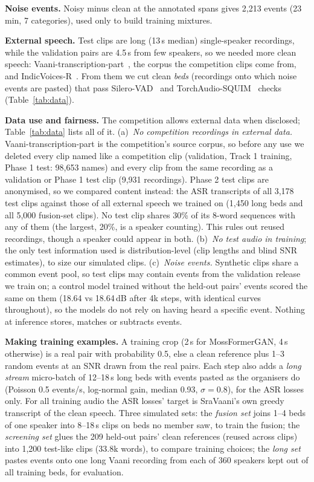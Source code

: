 \documentclass[conference]{IEEEtran}
\begin{document}
\textbf{Noise events.} Noisy minus clean at the annotated spans gives 2,213 events (23\,min, 7 categories), used
only to build training mixtures.

\textbf{External speech.} Test clips are long (13\,s median) single-speaker recordings, while the validation pairs
are 4.5\,s from few speakers, so we needed more clean speech: Vaani-transcription-part~\cite{vaani}, the corpus the
competition clips come from, and IndicVoices-R~\cite{ivr}. From them we cut clean \emph{beds} (recordings onto which
noise events are pasted) that pass Silero-VAD~\cite{silero} and TorchAudio-SQUIM~\cite{squim} checks
(Table~\ref{tab:data}).

\textbf{Data use and fairness.} The competition allows external data when disclosed; Table~\ref{tab:data} lists all
of it. (a)~\emph{No competition recordings in external data.} Vaani-transcription-part is the competition's source
corpus, so before any use we deleted every clip named like a competition clip (validation, Track 1 training, Phase 1
test: 98,653 names) and every clip from the same recording as a validation or Phase 1 test clip (9,931 recordings). Phase 2 test clips are anonymised, so we compared content instead: the ASR
transcripts of all 3,178 test clips against those of all external speech we trained on (1,450 long beds and all 5,000
fusion-set clips). No test clip shares 30\% of its 8-word sequences with any of them (the largest, 20\%, is a speaker
counting). This rules out reused recordings, though a speaker could appear in both.
(b)~\emph{No test audio in training}; the only test information used is distribution-level (clip lengths and blind SNR
estimates), to size our simulated clips. (c)~\emph{Noise events.} Synthetic clips share a common event pool, so test
clips may contain events from the validation release we train on; a control model trained without the held-out pairs'
events scored the same on them (18.64 vs 18.64\,dB after 4k steps, with identical curves throughout), so the models do not rely on having heard a specific event.
Nothing at inference stores, matches or subtracts events.

\textbf{Making training examples.} A training crop (2\,s for MossFormerGAN, 4\,s otherwise) is a real pair with
probability 0.5, else a clean reference plus 1--3 random events at an SNR drawn from the real pairs. Each step also adds
a \emph{long stream} micro-batch of 12--18\,s long beds with events pasted as the organisers do (Poisson 0.5 events/s,
log-normal gain, median 0.93, $\sigma{=}0.8$), for the ASR losses only. For all training audio the ASR losses' target is SraVaani's own
greedy transcript of the clean speech. Three simulated sets: the \emph{fusion set} joins 1--4 beds of one speaker into 8--18\,s clips on
beds no member saw, to train the fusion; the \emph{screening set} glues the 209 held-out pairs' clean references
(reused across clips) into 1,200 test-like clips (33.8k words), to compare training choices; the \emph{long set} pastes
events onto one long Vaani recording from each of 360 speakers kept out of all training beds, for evaluation.
\end{document}
